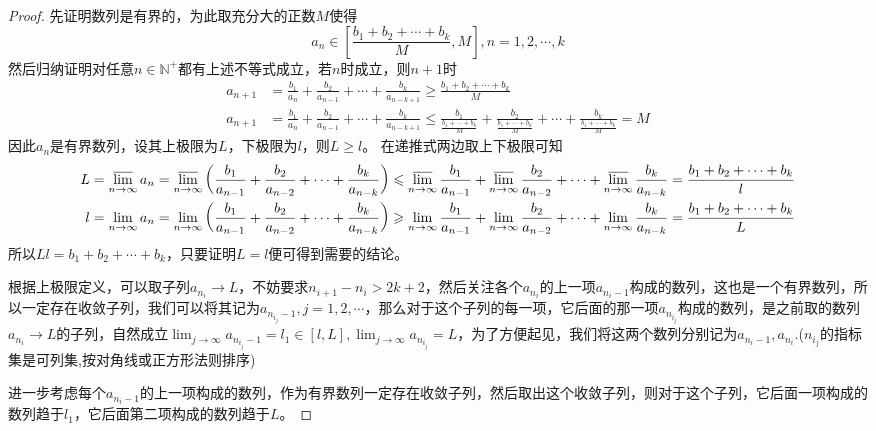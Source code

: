 \documentclass[../../main.tex]{subfiles}%
\begin{document}
\begin{proof}

先证明数列是有界的，为此取充分大的正数\(M\)使得
\[a_n\in\left[\frac{b_1 + b_2+\cdots + b_k}{M},M\right],n = 1,2,\cdots,k\]
然后归纳证明对任意\(n\in\mathbb{N}^+\)都有上述不等式成立，若\(n\)时成立，则\(n + 1\)时
\begin{align*}
a_{n + 1}&=\frac{b_1}{a_n}+\frac{b_2}{a_{n - 1}}+\cdots+\frac{b_k}{a_{n - k+1}}\geqslant \frac{b_1 + b_2+\cdots + b_k}{M}\\
a_{n + 1}&=\frac{b_1}{a_n}+\frac{b_2}{a_{n - 1}}+\cdots+\frac{b_k}{a_{n - k+1}}\leqslant \frac{b_1}{\frac{b_1 + \cdots + b_k}{M}}+\frac{b_2}{\frac{b_1 + \cdots + b_k}{M}}+\cdots+\frac{b_k}{\frac{b_1 + \cdots + b_k}{M}}=M
\end{align*}
因此\(a_n\)是有界数列，设其上极限为\(L\)，下极限为\(l\)，则\(L\geqslant  l\)。
在递推式两边取上下极限可知
\begin{align*}
L&=\varlimsup_{n\rightarrow\infty}a_n=\varlimsup_{n\rightarrow\infty}\left(\frac{b_1}{a_{n - 1}}+\frac{b_2}{a_{n - 2}}+\cdots+\frac{b_k}{a_{n - k}}\right)\leqslant \varlimsup_{n\rightarrow\infty}\frac{b_1}{a_{n - 1}}+\varlimsup_{n\rightarrow\infty}\frac{b_2}{a_{n - 2}}+\cdots+\varlimsup_{n\rightarrow\infty}\frac{b_k}{a_{n - k}}=\frac{b_1 + b_2+\cdots + b_k}{l}\\
l&=\lim_{n\rightarrow\infty}a_n=\lim_{n\rightarrow\infty}\left(\frac{b_1}{a_{n - 1}}+\frac{b_2}{a_{n - 2}}+\cdots+\frac{b_k}{a_{n - k}}\right)\geqslant \lim_{n\rightarrow\infty}\frac{b_1}{a_{n - 1}}+\lim_{n\rightarrow\infty}\frac{b_2}{a_{n - 2}}+\cdots+\lim_{n\rightarrow\infty}\frac{b_k}{a_{n - k}}=\frac{b_1 + b_2+\cdots + b_k}{L}
\end{align*}
所以\(Ll=b_1 + b_2+\cdots + b_k\)，只要证明\(L = l\)便可得到需要的结论。

根据上极限定义，可以取子列\(a_{n_i}\to L\)，不妨要求\(n_{i + 1}-n_i>2k + 2\)，然后关注各个\(a_{n_i}\)的上一项\(a_{n_i - 1}\)构成的数列，这也是一个有界数列，所以一定存在收敛子列，我们可以将其记为\(a_{n_{i_j}-1},j = 1,2,\cdots\)，那么对于这个子列的每一项，它后面的那一项\(a_{n_{i_j}}\)构成的数列，是之前取的数列\(a_{n_i}\to L\)的子列，自然成立\(\lim_{j\rightarrow\infty}a_{n_{i_j}-1}=l_1\in[l,L],\lim_{j\rightarrow\infty}a_{n_{i_j}} = L\)，为了方便起见，我们将这两个数列分别记为\(a_{n_{i}-1},a_{n_{i}}\).($n_{i_j}$的指标集是可列集,按对角线或正方形法则排序)

进一步考虑每个\(a_{n_{i}-1}\)的上一项构成的数列，作为有界数列一定存在收敛子列，然后取出这个收敛子列，则对于这个子列，它后面一项构成的数列趋于\(l_1\)，它后面第二项构成的数列趋于\(L\)。


\end{proof}
\end{document}
